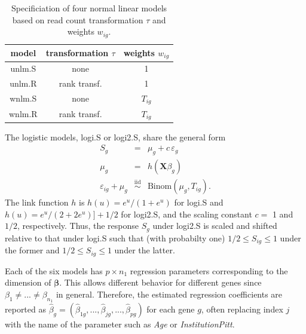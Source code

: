 \documentclass[letterpaper]{article}
\begin{document}
\begin{table}
\begin{center}
\begin{tabular}{c|cc}
model & transformation \(\tau\) & weights \(w_{ig}\) \\
\hline
unlm.S & none & 1 \\
unlm.R & rank transf. & 1 \\
wnlm.S & none & \(T_{ig}\) \\
wnlm.R & rank transf. & \(T_{ig}\) \\
\end{tabular}
\end{center}
\caption{Specificiation of four normal linear models based on read count
transformation \(\tau\) and weights \(w_{ig}\).}
\label{tab:nlm}
\end{table}

The logistic models, logi.S or logi2.S, share the general form
\begin{eqnarray}
S_g &=& \mu_g + c\, \varepsilon_g
\label{eq:logi-general}
\\
\mu_g &=& h(\mathbf{X} \beta_g) \\
\varepsilon_{ig} + \mu_g &\overset{\mathrm{iid}}{\sim}& \mathrm{Binom}(\mu_g, T_{ig}).
\label{eq:binom-error}
\end{eqnarray}
The link function \(h\) is \(h(u) = e^u / (1 + e^u)\) for logi.S and \(h(u) =
e^u / (2 + 2e^u)] + 1/2\) for logi2.S, and the scaling constant \(c=\) 1
 and \(1/2\), respectively.  Thus, the response \(S_g\) under logi2.S is scaled and shifted relative to
that under logi.S such that (with probabilty one) \(1/2\le S_{ig}\le 1\) under the former and
\(1/2\le S_{ig}\le 1\) under the latter.

Each of the six models has \(p\times n_1\) regression parameters corresponding to the
dimension of \(\boldsymbol{\beta}\).  This allows different behavior for
different genes since \(\beta_1\neq ...\neq\beta_{n_1}\) in general.
Therefore, the estimated regression coefficients are reported as \(\hat{\beta}_g =
(\hat{\beta}_{1g},...,\hat{\beta}_{jg},...,\hat{\beta}_{pg})\) for each gene \(g\), often
replacing index \(j\) with the name of the parameter such as \emph{Age} or
\emph{InstitutionPitt}.
\end{document}
